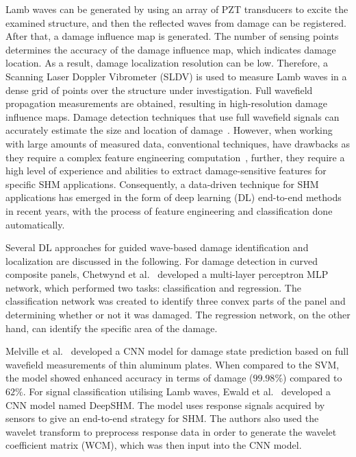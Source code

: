 \documentclass[runningheads]{llncs}
\begin{document}
Lamb waves can be generated by using an array of PZT transducers to excite the examined structure, and then the reflected waves from damage can be registered.
After that, a damage influence map is generated.
The number of sensing points determines the accuracy of the damage influence map, which indicates damage location.
As a result, damage localization resolution can be low.
Therefore, a Scanning Laser Doppler Vibrometer (SLDV) is used to measure Lamb waves in a dense grid of points over the structure under investigation.
Full wavefield propagation measurements are obtained, resulting in high-resolution damage influence maps.
Damage detection techniques that use full wavefield signals can accurately estimate the size and location of damage~\cite{Girolamo2018a}.
However, when working with large amounts of measured data, conventional techniques, have drawbacks as they require a complex feature engineering computation~\cite{Gulgec2019}, further, they require a high level of experience and abilities to extract damage-sensitive features for specific SHM applications.
Consequently, a data-driven technique for SHM applications has emerged in the form of deep learning (DL) end-to-end methods in recent years, with the process of feature engineering and classification done automatically.


Several DL approaches for guided wave-based damage identification and localization are discussed in the following.
For damage detection in curved composite panels, Chetwynd et al.~\cite{Chetwynd2008} developed a multi-layer perceptron MLP network,
which performed two tasks: classification and regression.
The classification network was created to identify three convex parts of the panel and determining whether or not it was damaged.
The regression network, on the other hand, can identify the specific area of the damage.

Melville et al.~\cite{Melville2018} developed a CNN model for damage state prediction based on full wavefield measurements of thin aluminum plates.
When compared to the SVM, the model showed enhanced accuracy in terms of damage (\(99.98\%\)) compared to \(62\%\).
For signal classification utilising Lamb waves, Ewald et al.~\cite{Ewald2019} developed a CNN model named DeepSHM.
The model uses response signals acquired by sensors to give an end-to-end strategy for SHM.
The authors also used the wavelet transform to preprocess response data in order to generate the wavelet coefficient matrix (WCM), which was then input into the CNN model.
\end{document}
